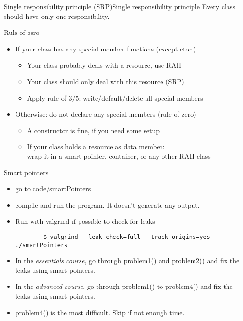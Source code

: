 \begin{frame}[fragile]
    \begin{goodpracticeWithShortcut}{Single responsibility principle (SRP)}{Single responsibility principle}
        Every class should have only one responsibility.
    \end{goodpracticeWithShortcut}
    \begin{goodpractice}{Rule of zero}
        \begin{itemize}
            \item If your class has any special member functions (except ctor.)
            \begin{itemize}
                \item Your class probably deals with a resource, use RAII
                \item Your class should only deal with this resource (SRP)
                \item Apply rule of 3/5: write/default/delete all special members
            \end{itemize}
            \item Otherwise: do not declare any special members (rule of zero)
            \begin{itemize}
                \item A constructor is fine, if you need some setup
                \item If your class holds a resource as data member:\\
                      wrap it in a smart pointer, container, or any other RAII class
            \end{itemize}
        \end{itemize}
    \end{goodpractice}
\end{frame}

\begin{frame}[fragile]
  \begin{exercise}{Smart pointers}
    \begin{itemize}
    \item go to code/smartPointers
    \item compile and run the program. It doesn't generate any output.
    \item Run with valgrind if possible to check for leaks
      { \scriptsize
      \begin{verbatim}
        $ valgrind --leak-check=full --track-origins=yes ./smartPointers
      \end{verbatim}
      }
    \item In the \emph{essentials course}, go through {\ttfamily problem1()} and {\ttfamily problem2()} and fix the leaks using smart pointers.
    \item In the \emph{advanced course}, go through {\ttfamily problem1()} to {\ttfamily problem4()} and fix the leaks using smart pointers.
    \item {\ttfamily problem4()} is the most difficult. Skip if not enough time.
    \end{itemize}
  \end{exercise}
\end{frame}
